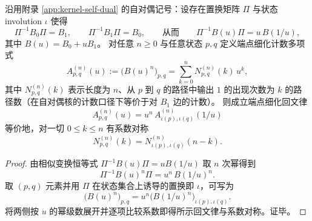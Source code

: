 \begin{theorem}[自对偶同步核的端点细化回文律]\label{thm:sync-kernel-endpoint-refined-palindrome}
沿用附录 \ref{app:kernel-self-dual} 的自对偶记号：设存在置换矩阵 \(\Pi\) 与状态 involution \(\iota\) 使得
\[
\Pi^{-1}B_0\Pi=B_1,\qquad \Pi^{-1}B_1\Pi=B_0,
\qquad\text{从而}\qquad
\Pi^{-1}B(u)\Pi=u\,B(1/u),
\]
其中 \(B(u)=B_0+uB_1\)。
对任意 \(n\ge 0\) 与任意状态 \(p,q\) 定义端点细化计数多项式
\[
A^{(n)}_{p,q}(u):=\bigl(B(u)^n\bigr)_{p,q}=\sum_{k=0}^{n}N^{(n)}_{p,q}(k)\,u^{k},
\]
其中 \(N^{(n)}_{p,q}(k)\) 表示长度为 \(n\)、从 \(p\) 到 \(q\) 的路径中输出 \(1\) 的出现次数为 \(k\) 的路径数（在自对偶核的计数口径下等价于对 \(B_1\) 边的计数）。
则成立端点细化回文律
\[
\boxed{\;
A^{(n)}_{p,q}(u)=u^{n}\,A^{(n)}_{\iota(p),\iota(q)}(1/u)\;}
\]
等价地，对一切 \(0\le k\le n\) 有系数对称
\[
\boxed{\;
N^{(n)}_{p,q}(k)=N^{(n)}_{\iota(p),\iota(q)}(n-k).\;}
\]
\end{theorem}
\begin{proof}
由相似变换恒等式 \(\Pi^{-1}B(u)\Pi=uB(1/u)\) 取 \(n\) 次幂得到
\[
\Pi^{-1}B(u)^n\Pi=u^n\,B(1/u)^n.
\]
取 \((p,q)\) 元素并用 \(\Pi\) 在状态集合上诱导的置换即 \(\iota\)，可写为
\[
\bigl(B(u)^n\bigr)_{p,q}=u^n\bigl(B(1/u)^n\bigr)_{\iota(p),\iota(q)}.
\]
将两侧按 \(u\) 的幂级数展开并逐项比较系数即得所示回文律与系数对称。证毕。
\end{proof}

